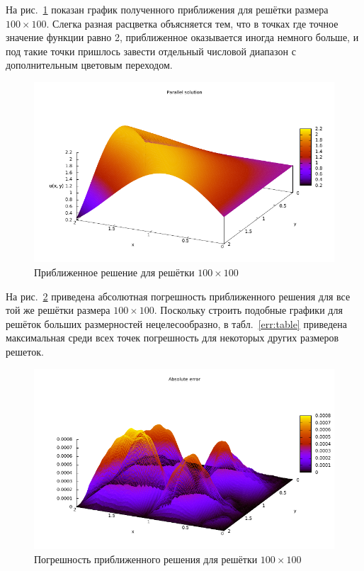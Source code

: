 \documentclass[12pt,notitlepage,oneside]{extarticle}
\begin{document}
На рис.~\ref{parallel:image} показан график полученного приближения для решётки
размера $100 \times 100$. Слегка разная расцветка объясняется тем, что в точках
где точное значение функции равно 2, приближенное оказывается иногда немного
больше, и под такие точки пришлось завести отдельный числовой диапазон с
дополнительным цветовым переходом.

\begin{figure}[h]
  \centering
  \includegraphics[scale=1.3]{mine_sol.pdf}
  \caption{Приближенное решение для решётки $100 \times 100$}
  \label{parallel:image}
\end{figure}

На рис.~\ref{err:image} приведена абсолютная погрешность приближенного решения
для все той же решётки размера $100 \times 100$. Поскольку строить подобные
графики для решёток больших размерностей нецелесообразно, в табл.~\ref{err:table}
приведена максимальная среди всех точек погрешность для некоторых других размеров
решеток.

\begin{figure}[h]
  \centering
  \includegraphics[scale=1.3]{abs_error.pdf}
  \caption{Погрешность приближенного решения для решётки $100 \times 100$}
  \label{err:image}
\end{figure}
\end{document}
